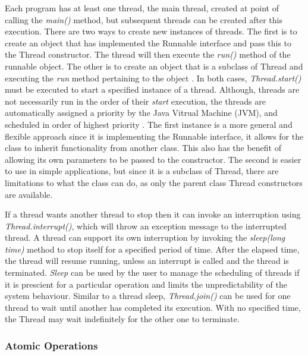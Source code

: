 \documentclass[a4paper,12pt]{article}
\begin{document}
Each program has at least one thread, the main thread, created at point of calling the \textit{main()} method, but subsequent threads can be created after this execution. There are two ways to create new instances of threads. The first is to create an object that has implemented the Runnable interface and pass this to the Thread constructor. The thread will then execute the \textit{run()} method of the runnable object. The other is to create an object that is a subclass of Thread and executing the \textit{run} method pertaining to the object \citep{concurrency19}. In both cases, \textit{Thread.start()} must be executed to start a specified instance of a thread. Although, threads are not necessarily run in the order of their \textit{start} execution, the threads are automatically assigned a priority by the Java Vitrual Machine (JVM), and scheduled in order of highest priority \citep{mois15}. The first instance is a more general and flexible approach since it is implementing the Runnable interface, it allows for the class to inherit functionality from another class. This also has the benefit of allowing its own parameters to be passed to the constructor. The second is easier to use in simple applications, but since it is a subclass of Thread, there are limitations to what the class can do, as only the parent class Thread constructors are available. 

If a thread wants another thread to stop then it can invoke an interruption using \textit{Thread.interrupt()}, which will throw an exception message to the interrupted thread. A thread can support its own interruption by invoking the \textit{sleep(long time)} method to stop itself for a specified period of time. After the elapsed time, the thread will resume running, unless an interrupt is called and the thread is terminated. \textit{Sleep} can be used by the user to manage the scheduling of threads if it is prescient for a particular operation and limits the unpredictability of the system behaviour. Similar to a thread sleep, \textit{Thread.join()} can be used for one thread to wait until another has completed its execution. With no specified time, the Thread may wait indefinitely for the other one to terminate. 


\subsubsection{Atomic Operations} \label{section:atmoic}
\end{document}
